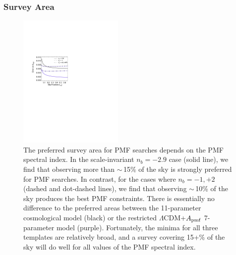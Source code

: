 \documentclass[apj]{emulateapj}
\newcommand{\apmf}{\ensuremath{A_{\rm pmf}}}
\newcommand{\lcdm}{\ensuremath{\Lambda}CDM}
\begin{document}
\subsubsection{Survey Area}

\begin{figure}[htb]\centering
\includegraphics[width=0.45\textwidth,clip,trim={1.5cm 12.5cm 11cm 7.5cm}]{pmf_area.pdf}
  \caption[Area dependence]{
  The preferred survey area for PMF searches depends on the PMF spectral index. 
    In the scale-invariant $n_b = -2.9$ case (solid line), we find that observing more than $\sim$\,15\% of the sky is strongly preferred for PMF searches. 
 In contrast, for the cases where $n_b = -1, +2$ (dashed and dot-dashed lines), we find that observing  $\sim$\,10\% of the sky produces the best PMF constraints. 
   There is essentially no difference to the preferred areas between the 11-parameter cosmological model (black) or the restricted \lcdm{}+\apmf{} 7-parameter model (purple). 
     Fortunately, the minima for all three templates are relatively broad, and a survey covering 15+\% of the sky will do well for all values of the PMF spectral index. 
    \label{fig:area}
  }
\end{figure}
\end{document}
